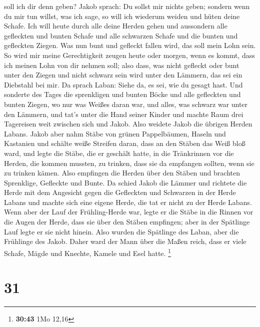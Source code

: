 soll ich dir denn geben? Jakob sprach: Du sollst mir nichts geben;
sondern wenn du mir tun willst, was ich sage, so will ich wiederum
weiden und hüten deine Schafe.  Ich will heute durch alle
deine Herden gehen und aussondern alle gefleckten und bunten Schafe und
alle schwarzen Schafe und die bunten und gefleckten Ziegen. Was nun bunt
und gefleckt fallen wird, das soll mein Lohn sein.  So wird
mir meine Gerechtigkeit zeugen heute oder morgen, wenn es kommt, dass
ich meinen Lohn von dir nehmen soll; also dass, was nicht gefleckt oder
bunt unter den Ziegen und nicht schwarz sein wird unter den Lämmern, das
sei ein Diebstahl bei mir.  Da sprach Laban: Siehe da, es
sei, wie du gesagt hast.  Und sonderte des Tages die
sprenkligen und bunten Böcke und alle gefleckten und bunten Ziegen, wo
nur was Weißes daran war, und alles, was schwarz war unter den Lämmern,
und tat's unter die Hand seiner Kinder  und machte Raum
drei Tagereisen weit zwischen sich und Jakob. Also weidete Jakob die
übrigen Herden Labans.  Jakob aber nahm Stäbe von grünen
Pappelbäumen, Haseln und Kastanien und schälte weiße Streifen daran,
dass an den Stäben das Weiß bloß ward,  und legte die
Stäbe, die er geschält hatte, in die Tränkrinnen vor die Herden, die
kommen mussten, zu trinken, dass sie da empfangen sollten, wenn sie zu
trinken kämen.  Also empfingen die Herden über den Stäben
und brachten Sprenklige, Gefleckte und Bunte.  Da schied
Jakob die Lämmer und richtete die Herde mit dem Angesicht gegen die
Gefleckten und Schwarzen in der Herde Labans und machte sich eine eigene
Herde, die tat er nicht zu der Herde Labans.  Wenn aber der
Lauf der Frühling-Herde war, legte er die Stäbe in die Rinnen vor die
Augen der Herde, dass sie über den Stäben empfingen;  aber
in der Spätlinge Lauf legte er sie nicht hinein. Also wurden die
Spätlinge des Laban, aber die Frühlinge des Jakob.  Daher
ward der Mann über die Maßen reich, dass er viele Schafe, Mägde und
Knechte, Kamele und Esel hatte. \footnote{\textbf{30:43} 1Mo 12,16}

\hypertarget{section-6}{%
\section{31}\label{section-6}}

